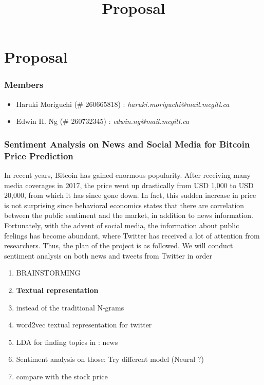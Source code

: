 \documentclass[12pt,a4paper]{report}
\begin{document}
\title{Proposal\\
}


\setcounter{page}{1}
\thispagestyle{empty} 


\chapter*{Proposal}
\subsection*{Members}
\begin{itemize}
\item Haruki Moriguchi (\# 260665818) : \textit{haruki.moriguchi@mail.mcgill.ca}
\item Edwin H. Ng (\# 260732345) : \textit{edwin.ng@mail.mcgill.ca}
\end{itemize}
\subsection*{Sentiment Analysis on News and Social Media for Bitcoin Price Prediction}
\par \qquad In recent years, Bitcoin has gained enormous popularity. After receiving many media coverages in 2017, the  price went up drastically from USD 1,000 to USD 20,000, from which it has since gone down. In fact, this sudden increase in price is not surprising since behavioral economics states that there are correlation between the public sentiment and the market, in addition to news information. Fortunately, with the advent of social media, the information about public feelings has become abundant, where Twitter has received a lot of attention from researchers. Thus, the plan of the project is as followed. We will conduct sentiment analysis on both news and tweets from Twitter in order 
\\
\begin{enumerate}
\item BRAINSTORMING
\item \textbf{Textual representation}
\item instead of the traditional N-grams
\item  word2vec textual representation  for twitter
\item LDA for finding topics in : news 
\item Sentiment analysis on those: Try different model (Neural ?)
\item compare with the stock price
\end{enumerate}
\end{document}
